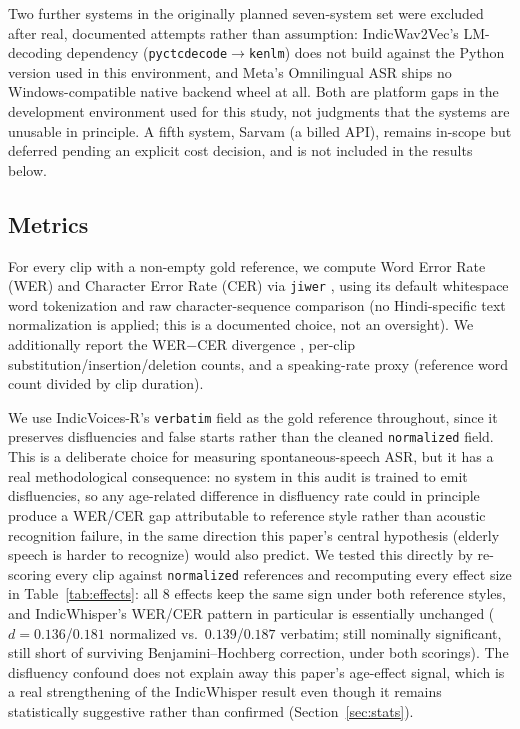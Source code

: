 \documentclass[11pt]{article}
\begin{document}
Two further systems in the originally planned seven-system set were excluded after real,
documented attempts rather than assumption: IndicWav2Vec's LM-decoding dependency
(\texttt{pyctcdecode}$\rightarrow$\texttt{kenlm}) does not build against the Python version used
in this environment, and Meta's Omnilingual ASR ships no Windows-compatible native backend wheel
at all. Both are platform gaps in the development environment used for this study, not judgments
that the systems are unusable in principle. A fifth system, Sarvam (a billed API), remains
in-scope but deferred pending an explicit cost decision, and is not included in the results below.

\subsection{Metrics}
\label{sec:metrics}

For every clip with a non-empty gold reference, we compute Word Error Rate (WER) and Character
Error Rate (CER) via \texttt{jiwer} \citep{jiwer}, using its default whitespace word tokenization
and raw character-sequence comparison (no Hindi-specific text normalization is applied; this is a
documented choice, not an oversight). We additionally report the WER$-$CER divergence
\citep{thennal2025cer}, per-clip substitution/insertion/deletion counts, and a speaking-rate
proxy (reference word count divided by clip duration).

We use IndicVoices-R's \texttt{verbatim} field as the gold reference throughout, since it
preserves disfluencies and false starts rather than the cleaned \texttt{normalized} field. This is
a deliberate choice for measuring spontaneous-speech ASR, but it has a real methodological
consequence: no system in this audit is trained to emit disfluencies, so any age-related
difference in disfluency rate could in principle produce a WER/CER gap attributable to reference
style rather than acoustic recognition failure, in the same direction this paper's central
hypothesis (elderly speech is harder to recognize) would also predict. We tested this directly by
re-scoring every clip against \texttt{normalized} references and recomputing every effect size in
Table~\ref{tab:effects}: all 8 effects keep the same sign under both reference styles, and
IndicWhisper's WER/CER pattern in particular is essentially unchanged ($d=0.136$/$0.181$
normalized vs.\ $0.139$/$0.187$ verbatim; still nominally significant, still short of surviving
Benjamini--Hochberg correction, under both scorings). The disfluency confound does not explain away
this paper's age-effect signal, which is a real strengthening of the IndicWhisper result even
though it remains statistically suggestive rather than confirmed (Section~\ref{sec:stats}).
\end{document}
